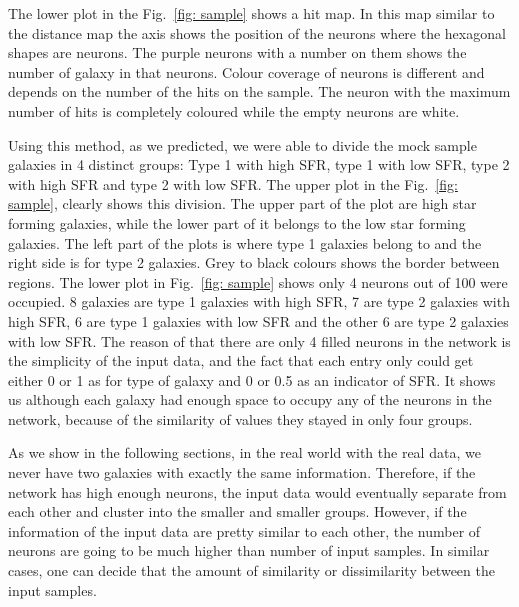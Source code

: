 The lower plot in the Fig.~\ref{fig: sample} shows a hit map.
 In this map similar to the distance map the axis shows the position of the neurons where the hexagonal shapes are neurons.
 The purple neurons with a number on them shows the number of galaxy in that neurons.
 Colour coverage of neurons is different and depends on the number of the hits on the sample.
 The neuron with the maximum number of hits is completely coloured while the empty neurons are white.

Using this method, as we predicted, we were able to divide the mock sample galaxies in 4 distinct groups: Type 1 with high SFR, type 1 with low SFR, type 2 with high SFR and type 2 with low SFR. 
The upper plot in the Fig.~\ref{fig: sample}, clearly shows this division.
The upper part of the plot are high star forming galaxies, while the lower part of it belongs to the low star forming galaxies.
The left part of the plots is where type 1 galaxies belong to and the right side is for type 2 galaxies.
Grey to black colours shows the border between regions.
The lower plot in Fig.~\ref{fig: sample} shows only 4 neurons out of 100 were occupied. 
8 galaxies are type 1 galaxies with high SFR, 7 are type 2 galaxies with high SFR, 6 are type 1 galaxies with low SFR and the other 6 are type 2 galaxies with low SFR. 
The reason of that there are only 4 filled neurons in the network is the simplicity of the input data, and the fact that each entry only could get either 0 or 1 as for type of galaxy and 0 or 0.5 as an indicator of SFR.
It shows us although each galaxy had enough space to occupy any of the neurons in the network, because of the similarity of values they stayed in only four groups. 

As we show in the following sections, in the real world with the real data, we never have two galaxies with exactly the same information.
Therefore, if the network has high enough neurons, the input data would eventually separate from each other and cluster into the smaller and smaller groups. 
However, if the information of the input data are pretty similar to each other, the number of neurons are going to be much higher than number of input samples. 
In similar cases, one can decide that the amount of similarity or dissimilarity between the input samples.



